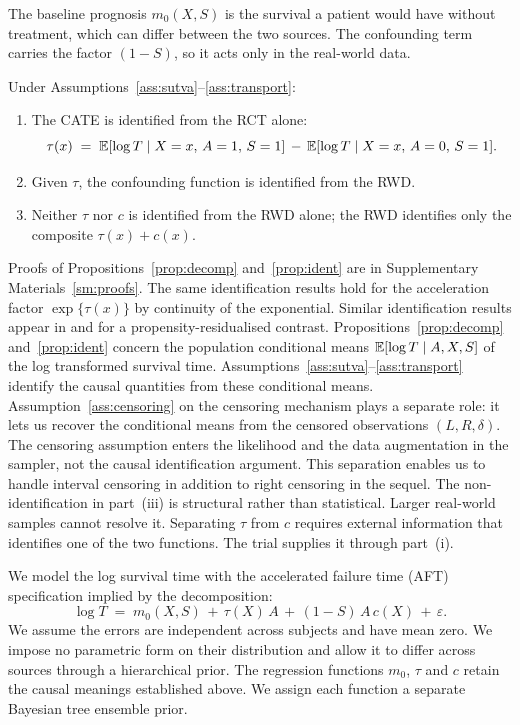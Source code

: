 The baseline prognosis $m_0(X, S)$ is the survival a patient would have without treatment, which can differ between the two sources.
The confounding term carries the factor $(1 - S)$, so it acts only in the real-world data.

\begin{proposition}[Identification]\label{prop:ident}
Under Assumptions~\ref{ass:sutva}--\ref{ass:transport}:
\begin{enumerate}[label=\textup{(\roman*)}]
\item The CATE is identified from the RCT alone:
\begin{equation}
\tau(x) \;=\; \mathbb{E}[\log T \mid X = x,\, A = 1,\, S = 1] \,-\, \mathbb{E}[\log T \mid X = x,\, A = 0,\, S = 1].
\label{eq:ident-tau}
\end{equation}
\item Given $\tau$, the confounding function is identified from the RWD.
\item Neither $\tau$ nor $c$ is identified from the RWD alone; the RWD identifies only the composite $\tau(x) + c(x)$.
\end{enumerate}
\end{proposition}

Proofs of Propositions~\ref{prop:decomp} and~\ref{prop:ident} are in Supplementary Materials~\ref{sm:proofs}.
The same identification results hold for the acceleration factor $\exp\{\tau(x)\}$ by continuity of the exponential.
Similar identification results appear in \citet{YangLiuZengWang2025} and \citet{Ye2025} for a propensity-residualised contrast.
Propositions~\ref{prop:decomp} and~\ref{prop:ident} concern the population conditional means $\mathbb{E}[\log T \mid A, X, S]$ of the log transformed survival time.
Assumptions~\ref{ass:sutva}--\ref{ass:transport} identify the causal quantities from these conditional means.
Assumption~\ref{ass:censoring} on the censoring mechanism plays a separate role: it lets us recover the conditional means from the censored observations $(L, R, \delta)$.
The censoring assumption enters the likelihood and the data augmentation in the sampler, not the causal identification argument.
This separation enables us to handle interval censoring in addition to right censoring in the sequel.
The non-identification in part~(iii) is structural rather than statistical.
Larger real-world samples cannot resolve it.
Separating $\tau$ from $c$ requires external information that identifies one of the two functions.
The trial supplies it through part~(i).

We model the log survival time with the accelerated failure time (AFT) specification implied by the decomposition:
\begin{equation}
\log T \;=\; m_0(X, S) \,+\, \tau(X)\,A  \,+\, (1 - S)\,A\,c(X) \,+\, \varepsilon.
\label{eq:aft-model}
\end{equation}
We assume the errors are independent across subjects and have mean zero.
We impose no parametric form on their distribution and allow it to differ across sources through a hierarchical prior.
The regression functions $m_0$, $\tau$ and $c$ retain the causal meanings established above.
We assign each function a separate Bayesian tree ensemble prior.


